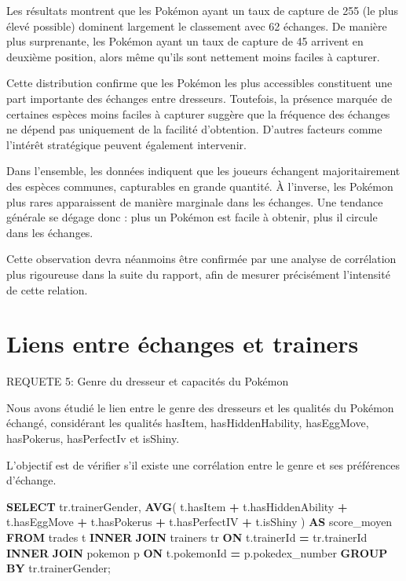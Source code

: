 \documentclass[mstat,12pt]{unswthesis}
\newenvironment{Shaded}{\begin{snugshade}}{\end{snugshade}}
\newcommand{\FunctionTok}[1]{\textcolor[rgb]{0.13,0.29,0.53}{\textbf{#1}}}
\newcommand{\KeywordTok}[1]{\textcolor[rgb]{0.13,0.29,0.53}{\textbf{#1}}}
\newcommand{\NormalTok}[1]{#1}
\newcommand{\OperatorTok}[1]{\textcolor[rgb]{0.81,0.36,0.00}{\textbf{#1}}}
\begin{document}
Les résultats montrent que les Pokémon ayant un taux de capture de 255
(le plus élevé possible) dominent largement le classement avec 62
échanges. De manière plus surprenante, les Pokémon ayant un taux de
capture de 45 arrivent en deuxième position, alors même qu'ils sont
nettement moins faciles à capturer.

Cette distribution confirme que les Pokémon les plus accessibles
constituent une part importante des échanges entre dresseurs. Toutefois,
la présence marquée de certaines espèces moins faciles à capturer
suggère que la fréquence des échanges ne dépend pas uniquement de la
facilité d'obtention. D'autres facteurs comme l'intérêt stratégique
peuvent également intervenir.

Dans l'ensemble, les données indiquent que les joueurs échangent
majoritairement des espèces communes, capturables en grande quantité. À
l'inverse, les Pokémon plus rares apparaissent de manière marginale dans
les échanges. Une tendance générale se dégage donc : plus un Pokémon est
facile à obtenir, plus il circule dans les échanges.

Cette observation devra néanmoins être confirmée par une analyse de
corrélation plus rigoureuse dans la suite du rapport, afin de mesurer
précisément l'intensité de cette relation.

\section{Liens entre échanges et
trainers}\label{liens-entre-uxe9changes-et-trainers}

\bigskip

REQUETE 5: Genre du dresseur et capacités du Pokémon

\bigskip

Nous avons étudié le lien entre le genre des dresseurs et les qualités
du Pokémon échangé, considérant les qualités hasItem, hasHiddenHability,
hasEggMove, hasPokerus, hasPerfectIv et isShiny.

L'objectif est de vérifier s'il existe une corrélation entre le genre et
ses préférences d'échange.

\begin{Shaded}
\begin{Highlighting}[]
\KeywordTok{SELECT} 
\NormalTok{    tr.trainerGender,}
    \FunctionTok{AVG}\NormalTok{(}
\NormalTok{        t.hasItem }\OperatorTok{+}
\NormalTok{        t.hasHiddenAbility }\OperatorTok{+}
\NormalTok{        t.hasEggMove }\OperatorTok{+}
\NormalTok{        t.hasPokerus }\OperatorTok{+}
\NormalTok{        t.hasPerfectIV }\OperatorTok{+}
\NormalTok{        t.isShiny}
\NormalTok{    ) }\KeywordTok{AS}\NormalTok{ score\_moyen}
\KeywordTok{FROM}\NormalTok{ trades t}
\KeywordTok{INNER} \KeywordTok{JOIN}\NormalTok{ trainers tr }\KeywordTok{ON}\NormalTok{ t.trainerId }\OperatorTok{=}\NormalTok{ tr.trainerId}
\KeywordTok{INNER} \KeywordTok{JOIN}\NormalTok{ pokemon p }\KeywordTok{ON}\NormalTok{ t.pokemonId }\OperatorTok{=}\NormalTok{ p.pokedex\_number}
\KeywordTok{GROUP} \KeywordTok{BY}\NormalTok{ tr.trainerGender;}
\end{Highlighting}
\end{Shaded}
\end{document}
